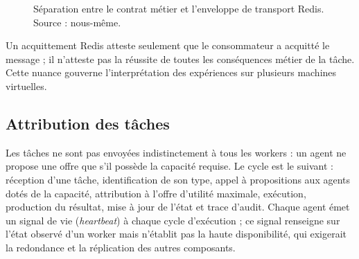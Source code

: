 \begin{figure}[H]
\centering
{}
\caption{Séparation entre le contrat métier et l'enveloppe de transport Redis. Source : nous-même.}
\label{fig:message-transport}
\end{figure}

Un acquittement Redis atteste seulement que le consommateur a acquitté le message ; il n'atteste pas la réussite de toutes les conséquences métier de la tâche. Cette nuance gouverne l'interprétation des expériences sur plusieurs machines virtuelles.

\subsection{Attribution des tâches}

Les tâches ne sont pas envoyées indistinctement à tous les workers : un agent ne propose une offre que s'il possède la capacité requise. Le cycle est le suivant : réception d'une tâche, identification de son type, appel à propositions aux agents dotés de la capacité, attribution à l'offre d'utilité maximale, exécution, production du résultat, mise à jour de l'état et trace d'audit. Chaque agent émet un signal de vie (\textit{heartbeat}) à chaque cycle d'exécution ; ce signal renseigne sur l'état observé d'un worker mais n'établit pas la haute disponibilité, qui exigerait la redondance et la réplication des autres composants.

